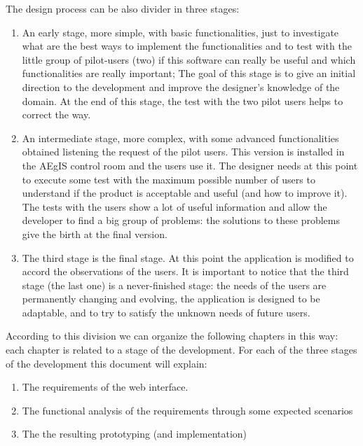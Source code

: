 The design process can be also divider in three stages:

\begin{enumerate}

\item An early stage, more simple, with basic functionalities, just to investigate what are the best ways to implement the functionalities and to test with the little group of pilot-users (two) if this software can really be useful and which functionalities are really important; The goal of this stage is to give an initial direction to the development and improve the designer's knowledge of the domain. At the end of this stage, the test with the two pilot users helps to correct the way.

\item An intermediate stage, more complex, with some advanced functionalities obtained listening the request of the pilot users. This version is installed in the AEgIS control room and the users use it. 
The designer needs at this point to execute some test with the maximum possible number of users to understand if the product is acceptable and useful (and how to improve it). 
The tests with the users show a lot of useful information and allow the developer to find a big group of problems: the solutions to these problems give the birth at the final version. 

\item
The third stage is the final stage. At this point the application is modified to accord the observations of the users. It is important to notice that the third stage (the last one) is a never-finished stage: the needs of the users are permanently changing and evolving, the application is designed to be adaptable, and to try to satisfy the unknown needs of future users.

\end{enumerate}

According to this division we can organize the following chapters in this way:
each chapter is related to a stage of the development.
For each of the three stages of the development this document will explain:

\begin {enumerate}

\item
The requirements of the web interface.

\item
The functional analysis of the requirements through some expected scenarios

\item
The the resulting prototyping (and implementation)  

\end {enumerate} 

